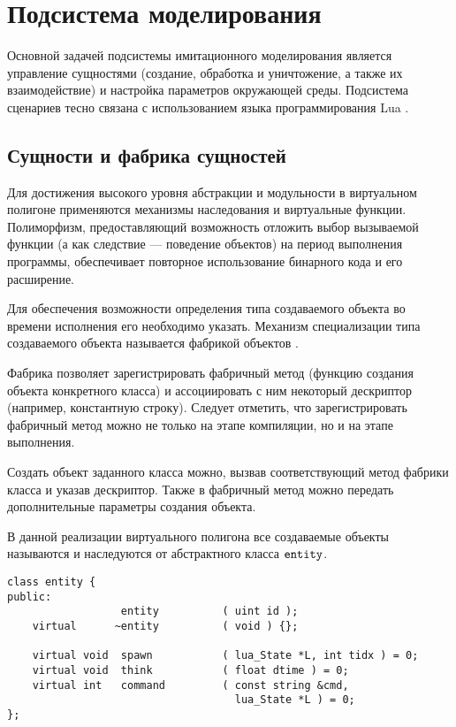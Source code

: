 \section{Подсистема моделирования}

Основной задачей подсистемы имитационного моделирования является управление сущностями (создание, обработка и уничтожение, а также их взаимодействие) и настройка параметров окружающей среды. Подсистема сценариев тесно связана с использованием языка программирования Lua \citep{lua}.

%

\subsection{Сущности и фабрика сущностей}

Для достижения высокого уровня абстракции и модульности в виртуальном полигоне применяются механизмы наследования и виртуальные функции. Полиморфизм, предоставляющий возможность отложить выбор вызываемой функции (а как следствие --- поведение объектов) на период выполнения программы, обеспечивает повторное использование бинарного кода и его расширение.

Для обеспечения возможности определения типа создаваемого объекта во времени исполнения его необходимо указать. Механизм специализации типа создаваемого объекта называется фабрикой объектов \citep{alexandresku}.

Фабрика позволяет зарегистрировать фабричный метод (функцию создания объекта конкретного класса) и ассоциировать с ним некоторый дескриптор (например, константную строку). Следует отметить, что зарегистрировать фабричный метод можно не только на этапе компиляции, но и на этапе выполнения.

Создать объект заданного класса можно, вызвав соответствующий метод фабрики класса и указав дескриптор.
Также в фабричный метод можно передать дополнительные параметры создания объекта.

В данной реализации виртуального полигона все создаваемые объекты называются  и наследуются от абстрактного класса $\tt entity$.

\begin{lstlisting}[caption={Декларация класса $\tt entity$}]
class entity {
public:
                  entity          ( uint id );
    virtual      ~entity          ( void ) {};
							
    virtual void  spawn           ( lua_State *L, int tidx ) = 0;
    virtual void  think           ( float dtime ) = 0;
    virtual int   command         ( const string &cmd, 
                                    lua_State *L ) = 0;
};
\end{lstlisting}

